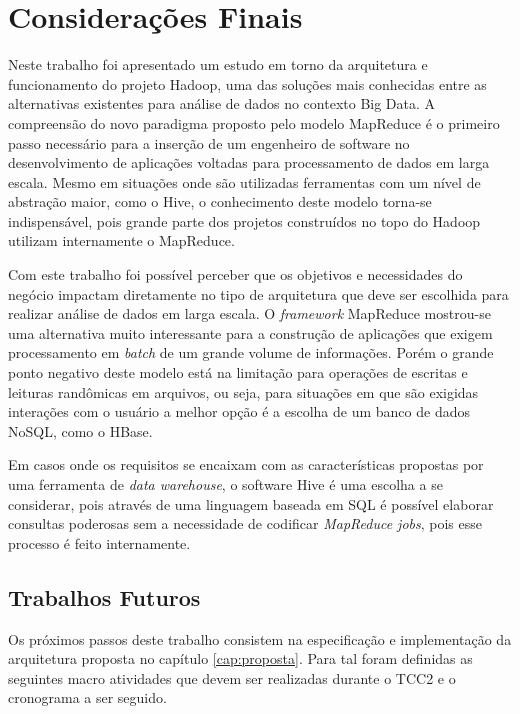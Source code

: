 \chapter{Considerações Finais}
\label{cap:conclusao}

Neste trabalho foi apresentado um estudo em torno da arquitetura e funcionamento do projeto Hadoop, uma das soluções mais conhecidas entre as alternativas existentes para análise de dados no contexto Big Data. A compreensão do novo paradigma proposto pelo modelo MapReduce é o primeiro passo necessário para a inserção de um engenheiro de software no desenvolvimento de aplicações voltadas para processamento de dados em larga escala. Mesmo em situações onde são utilizadas ferramentas com um nível de abstração maior, como o Hive, o conhecimento deste modelo torna-se indispensável, pois grande parte dos projetos construídos no topo do Hadoop utilizam internamente o MapReduce.

Com este trabalho foi possível perceber que os objetivos e necessidades do negócio impactam diretamente no tipo de arquitetura que deve ser escolhida para realizar análise de dados em larga escala. O \textit{framework} MapReduce mostrou-se uma alternativa muito interessante para a construção de aplicações que exigem processamento em \textit{batch} de um grande volume de informações. Porém o grande ponto negativo deste modelo está na limitação para operações de escritas e leituras randômicas em arquivos, ou seja, para situações em que são exigidas interações com o usuário a melhor opção é a escolha de um banco de dados NoSQL, como o HBase.

Em casos onde os requisitos se encaixam com as características propostas por uma ferramenta de \textit{data warehouse}, o software Hive é uma escolha a se considerar, pois através de uma linguagem baseada em SQL é possível elaborar consultas poderosas sem a necessidade de codificar \textit{MapReduce jobs}, pois esse processo é feito internamente.

\section{Trabalhos Futuros}

Os próximos passos deste trabalho consistem na especificação e implementação da arquitetura proposta no capítulo \ref{cap:proposta}. Para tal foram definidas as seguintes macro atividades que devem ser realizadas durante o TCC2 e o cronograma a ser seguido.

